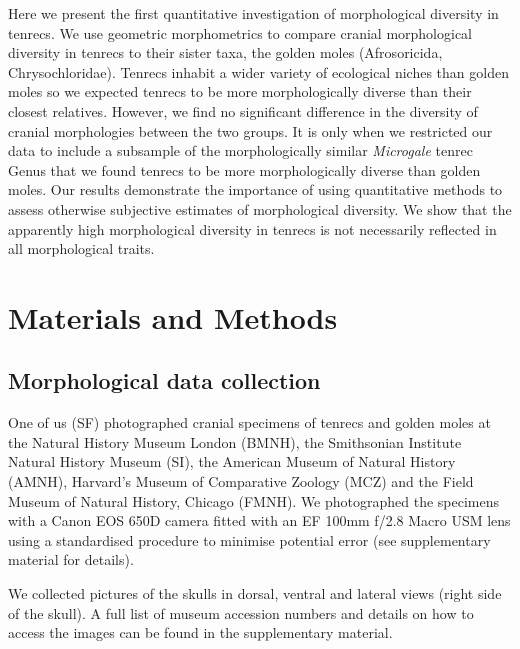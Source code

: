 \documentclass[12pt,a4paper]{article}
\begin{document}
	Here we present the first quantitative investigation of morphological diversity in tenrecs. We use geometric morphometrics to compare cranial morphological diversity in tenrecs to their sister taxa, the golden moles (Afrosoricida, Chrysochloridae). Tenrecs inhabit a wider variety of ecological niches \citep{Soarimalala2011} than golden moles \citep{Bronner1995} so we expected tenrecs to be more morphologically diverse than their closest relatives. However, we find no significant difference in the diversity of cranial morphologies between the two groups. It is only when we restricted our data to include a subsample of the morphologically similar \textit{Microgale} tenrec Genus that we found tenrecs to be more morphologically diverse than golden moles.
	Our results demonstrate the importance of using quantitative methods to assess otherwise subjective estimates of morphological diversity. We show that the apparently high morphological diversity in tenrecs is not necessarily reflected in all morphological traits.
	

\section{Materials and Methods}

\subsection{Morphological data collection} 
	
	One of us (SF) photographed cranial specimens of tenrecs and golden moles at the Natural History Museum London (BMNH), the Smithsonian Institute Natural History Museum (SI), the American Museum of Natural History (AMNH), Harvard's Museum of Comparative Zoology (MCZ) and the Field Museum of Natural History, Chicago (FMNH). We photographed the specimens with a Canon EOS 650D camera fitted with an EF 100mm f/2.8 Macro USM lens using a standardised procedure to minimise potential error (see supplementary material for details). 

	We collected pictures of the skulls in dorsal, ventral and lateral views (right side of the skull). A full list of museum accession numbers and details on how to access the images can be found in the supplementary material.
	
\end{document}
